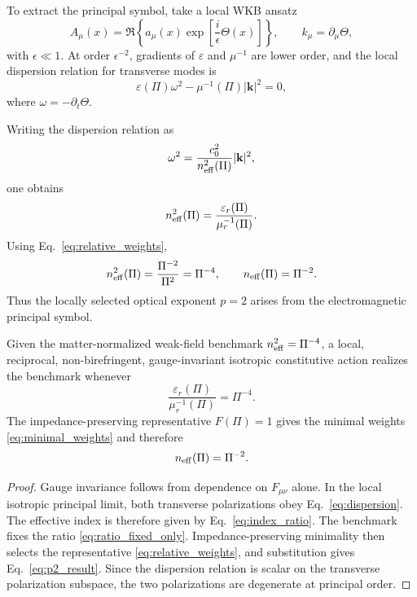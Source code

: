 \documentclass[12pt]{article}
\begin{document}
To extract the principal symbol, take a local WKB ansatz
\begin{equation}
 A_\mu(x)=\Re\left\{a_\mu(x)\exp\left[\frac{i}{\epsilon}\Theta(x)\right]\right\},
\qquad
 k_\mu=\partial_\mu\Theta,
\label{eq:WKB_ansatz}
\end{equation}
with $\epsilon\ll1$.  At order $\epsilon^{-2}$, gradients of $\varepsilon$ and $\mu^{-1}$ are lower order, and the local dispersion relation for transverse modes is
\begin{equation}
 \varepsilon(\Pi)\omega^2
 -\mu^{-1}(\Pi)|\mathbf k|^2=0,
\label{eq:dispersion}
\end{equation}
where $\omega=-\partial_t\Theta$.

Writing the dispersion relation as
\begin{equation}
 \omega^2=\frac{c_0^2}{n_{\rm eff}^2(\Pi)}|\mathbf k|^2,
\label{eq:index_def}
\end{equation}
one obtains
\begin{equation}
 n_{\rm eff}^2(\Pi)
 =\frac{\varepsilon_r(\Pi)}{\mu_r^{-1}(\Pi)}.
\label{eq:index_ratio}
\end{equation}
Using Eq.~\eqref{eq:relative_weights},
\begin{equation}
 n_{\rm eff}^2(\Pi)=\frac{\Pi^{-2}}{\Pi^2}=\Pi^{-4},
 \qquad
 n_{\rm eff}(\Pi)=\Pi^{-2}.
\label{eq:p2_result}
\end{equation}
Thus the locally selected optical exponent $p=2$ arises from the electromagnetic principal symbol.

\begin{proposition}
Given the matter-normalized weak-field benchmark \(n_{\rm eff}^2=\Pi^{-4}\), a local, reciprocal, non-birefringent, gauge-invariant isotropic constitutive action realizes the benchmark whenever
\begin{equation}
    \frac{\varepsilon_r(\Pi)}{\mu_r^{-1}(\Pi)}=\Pi^{-4} .
\end{equation}
The impedance-preserving representative \(F(\Pi)=1\) gives the minimal weights \eqref{eq:minimal_weights} and therefore
\begin{equation}
 n_{\rm eff}(\Pi)=\Pi^{-2}.
\end{equation}
\end{proposition}

\begin{proof}
Gauge invariance follows from dependence on $F_{\mu\nu}$ alone.  In the local isotropic principal limit, both transverse polarizations obey Eq.~\eqref{eq:dispersion}.  The effective index is therefore given by Eq.~\eqref{eq:index_ratio}.  The benchmark fixes the ratio \eqref{eq:ratio_fixed_only}.  Impedance-preserving minimality then selects the representative \eqref{eq:relative_weights}, and substitution gives Eq.~\eqref{eq:p2_result}.  Since the dispersion relation is scalar on the transverse polarization subspace, the two polarizations are degenerate at principal order.
\end{proof}
\end{document}
